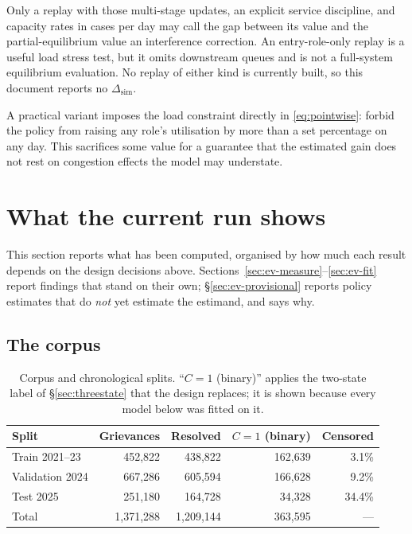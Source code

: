 \documentclass[11pt,a4paper]{article}
\theoremstyle{plain}
\theoremstyle{definition}
\theoremstyle{remark}
\begin{document}
Only a replay with those multi-stage updates, an explicit service discipline, and capacity
rates in cases per day may call the gap between its value and the partial-equilibrium value an
interference correction. An entry-role-only replay is a useful load stress test, but it omits
downstream queues and is not a full-system equilibrium evaluation. No replay of either kind is
currently built, so this document reports no $\Delta_{\text{sim}}$.

A practical variant imposes the load constraint directly in \eqref{eq:pointwise}: forbid the
policy from raising any role's utilisation by more than a set percentage on any day. This
sacrifices some value for a guarantee that the estimated gain does not rest on congestion
effects the model may understate.

\section{What the current run shows}\label{sec:evidence}

This section reports what has been computed, organised by how much each result depends on the
design decisions above. Sections~\ref{sec:ev-measure}--\ref{sec:ev-fit} report findings that
stand on their own; \S\ref{sec:ev-provisional} reports policy estimates that do \emph{not} yet
estimate the estimand, and says why.

\subsection{The corpus}

\begin{table}[h]
\centering
\caption{Corpus and chronological splits. ``$C=1$ (binary)'' applies the two-state label of
\S\ref{sec:threestate} that the design replaces; it is shown because every model below was
fitted on it.}
\label{tab:corpus}
\begin{tabular}{lrrrr}
\toprule
Split & Grievances & Resolved & $C=1$ (binary) & Censored\\
\midrule
Train 2021--23 & 452,822 & 438,822 & 162,639 & 3.1\%\\
Validation 2024 & 667,286 & 605,594 & 166,628 & 9.2\%\\
Test 2025 & 251,180 & 164,728 & 34,328 & 34.4\%\\
\midrule
Total & 1,371,288 & 1,209,144 & 363,595 & ---\\
\bottomrule
\end{tabular}
\end{table}
\end{document}
